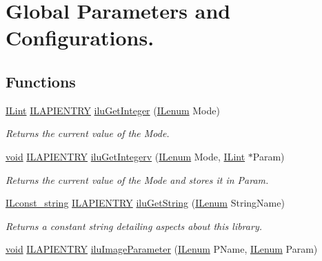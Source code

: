 \hypertarget{group__ilu__state}{\section{Global Parameters and Configurations.}
\label{group__ilu__state}
}
\subsection*{Functions}
\begin{DoxyCompactItemize}
\item 
\hyperlink{group__il__types_ga8effe51a00daaa0878631e5af75a36cb}{I\+Lint} \hyperlink{_i_l_8h_a69c08a8d06df986f7e46f209d131ef2f}{I\+L\+A\+P\+I\+E\+N\+T\+R\+Y} \hyperlink{group__ilu__state_gaecb69a456d72f9c6c449604217142710}{ilu\+Get\+Integer} (\hyperlink{group__il__types_ga62ca73445716183ef42b1f3906a45ed0}{I\+Lenum} Mode)
\begin{DoxyCompactList}\small\item\em Returns the current value of the {\itshape Mode}. \end{DoxyCompactList}\item 
\hyperlink{_i_l_8h_a5530e04d947bcddd83639ea7940faf10}{void} \hyperlink{_i_l_8h_a69c08a8d06df986f7e46f209d131ef2f}{I\+L\+A\+P\+I\+E\+N\+T\+R\+Y} \hyperlink{group__ilu__state_gad63d708dd1c58cc0c0ef857119879b6d}{ilu\+Get\+Integerv} (\hyperlink{group__il__types_ga62ca73445716183ef42b1f3906a45ed0}{I\+Lenum} Mode, \hyperlink{group__il__types_ga8effe51a00daaa0878631e5af75a36cb}{I\+Lint} $\ast$Param)
\begin{DoxyCompactList}\small\item\em Returns the current value of the {\itshape Mode} and stores it in {\itshape Param}. \end{DoxyCompactList}\item 
\hyperlink{group__il__types_ga1aa1edc3eb344e14acacb02bade24a5a}{I\+Lconst\+\_\+string} \hyperlink{_i_l_8h_a69c08a8d06df986f7e46f209d131ef2f}{I\+L\+A\+P\+I\+E\+N\+T\+R\+Y} \hyperlink{group__ilu__state_ga8c572ee3c422dfcc4991aeff712d1804}{ilu\+Get\+String} (\hyperlink{group__il__types_ga62ca73445716183ef42b1f3906a45ed0}{I\+Lenum} String\+Name)
\begin{DoxyCompactList}\small\item\em Returns a constant string detailing aspects about this library. \end{DoxyCompactList}\item 
\hyperlink{_i_l_8h_a5530e04d947bcddd83639ea7940faf10}{void} \hyperlink{_i_l_8h_a69c08a8d06df986f7e46f209d131ef2f}{I\+L\+A\+P\+I\+E\+N\+T\+R\+Y} \hyperlink{group__ilu__state_ga1f7db294cdcd2a8285ae24c29bb1f750}{ilu\+Image\+Parameter} (\hyperlink{group__il__types_ga62ca73445716183ef42b1f3906a45ed0}{I\+Lenum} P\+Name, \hyperlink{group__il__types_ga62ca73445716183ef42b1f3906a45ed0}{I\+Lenum} Param)

\end{DoxyCompactItemize}

